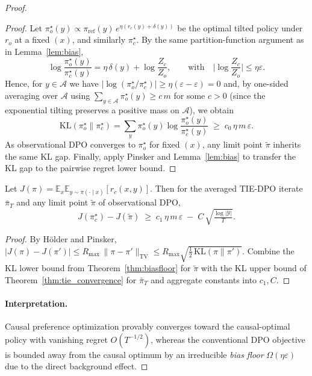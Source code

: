 \begin{proof}
\begin{proof}
Let $\pi_o^\star(y)\propto \pi_{\mathrm{ref}}(y)\,e^{\eta(r_c(y)+\delta(y))}$ be the optimal tilted policy under $r_o$ at a fixed $(x)$, and similarly $\pi_c^\star$.  
By the same partition-function argument as in Lemma~\ref{lem:bias},
\[
\log\frac{\pi_o^\star(y)}{\pi_c^\star(y)}
= \eta\,\delta(y)+\log\frac{Z_c}{Z_o},
\qquad
\text{with}\quad
\Big|\log\frac{Z_c}{Z_o}\Big|\le \eta\varepsilon.
\]
Hence, for $y\in\mathcal{A}$ we have $|\log(\pi_o^\star/\pi_c^\star)|\ge \eta(\varepsilon- \varepsilon)=0$ and, by one-sided averaging over $\mathcal{A}$ using $\sum_{y\in\mathcal{A}}\pi_o^\star(y)\ge c\,m$ for some $c>0$ (since the exponential tilting preserves a positive mass on $\mathcal{A}$), we obtain
\[
\mathrm{KL}(\pi_o^\star\|\pi_c^\star)
=\sum_y \pi_o^\star(y)\log\frac{\pi_o^\star(y)}{\pi_c^\star(y)}
\;\ge\; c_0\,\eta\,m\,\varepsilon.
\]
As observational DPO converges to $\pi_o^\star$ for fixed $(x)$, any limit point $\tilde\pi$ inherits the same KL gap.  
Finally, apply Pinsker and Lemma~\ref{lem:bias} to transfer the KL gap to the pairwise regret lower bound.
\end{proof}

\begin{corollary}\label{cor:gap}
Let $J(\pi)=\mathbb{E}_{x}\mathbb{E}_{y\sim\pi(\cdot\mid x)}[r_c(x,y)]$.  
Then for the averaged TIE-DPO iterate $\bar\pi_T$ and any limit point $\tilde\pi$ of observational DPO,
\[
J(\pi_c^\star)-J(\tilde\pi)\;\ge\; c_1\,\eta\,m\,\varepsilon
\;-\; C\,\sqrt{\tfrac{\log|\mathcal{Y}|}{T}}.
\]
\end{corollary}

\begin{proof}
By Hölder and Pinsker, $|J(\pi)-J(\pi')|\le R_{\max}\,\|\pi-\pi'\|_{\mathrm{TV}}
\le R_{\max}\sqrt{\tfrac12\,\mathrm{KL}(\pi\|\pi')}$.  
Combine the KL lower bound from Theorem~\ref{thm:biasfloor} for $\tilde\pi$ with the KL upper bound of Theorem~\ref{thm:tie_convergence} for $\bar\pi_T$ and aggregate constants into $c_1,C$.
\end{proof}

\paragraph{Interpretation.}
Causal preference optimization provably converges toward the causal-optimal policy with vanishing regret $O(T^{-1/2})$, whereas the conventional DPO objective is bounded away from the causal optimum by an irreducible \emph{bias floor} $\Omega(\eta\varepsilon)$
due to the direct background effect.



\end{proof}

